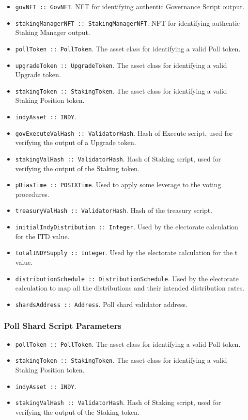 \documentclass{article}
\begin{document}
\begin{sloppypar}
\begin{itemize}
\item
  \texttt{govNFT~::~GovNFT}. NFT for identifying authentic Governance
  Script output.
\item
  \texttt{stakingManagerNFT~::~StakingManagerNFT}. NFT for identifying
  authentic Staking Manager output.
\item
  \texttt{pollToken~::~PollToken}. The asset class for identifying a
  valid Poll token.
\item
  \texttt{upgradeToken~::~UpgradeToken}. The asset class for identifying
  a valid Upgrade token.
\item
  \texttt{stakingToken~::~StakingToken}. The asset class for identifying
  a valid Staking Position token.
\item
  \texttt{indyAsset~::~INDY}.
\item
  \texttt{govExecuteValHash~::~ValidatorHash}. Hash of Execute script,
  used for verifying the output of a Upgrade token.
\item
  \texttt{stakingValHash~::~ValidatorHash}. Hash of Staking script, used
  for verifying the output of the Staking token.
\item
  \texttt{pBiasTime~::~POSIXTime}. Used to apply some leverage to the
  voting procedures.
\item
  \texttt{treasuryValHash~::~ValidatorHash}. Hash of the treasury
  script.
\item
  \texttt{initialIndyDistribution~::~Integer}. Used by the electorate
  calculation for the ITD value.
\item
  \texttt{totalINDYSupply~::~Integer}. Used by the electorate
  calculation for the t value.
\item
  \texttt{distributionSchedule~::~DistributionSchedule}. Used by the
  electorate calculation to map all the distributions and their intended
  distribution rates.
\item
  \texttt{shardsAddress~::~Address}. Poll shard validator address.
\end{itemize}

\hypertarget{poll-shard-script-parameters}{%
\subsubsection{Poll Shard Script
Parameters}\label{poll-shard-script-parameters}}

\begin{itemize}
\item
  \texttt{pollToken~::~PollToken}. The asset class for identifying a
  valid Poll token.
\item
  \texttt{stakingToken~::~StakingToken}. The asset class for identifying
  a valid Staking Position token.
\item
  \texttt{indyAsset~::~INDY}.
\item
  \texttt{stakingValHash~::~ValidatorHash}. Hash of Staking script, used
  for verifying the output of the Staking token.
\end{itemize}


\end{sloppypar}
\end{document}
